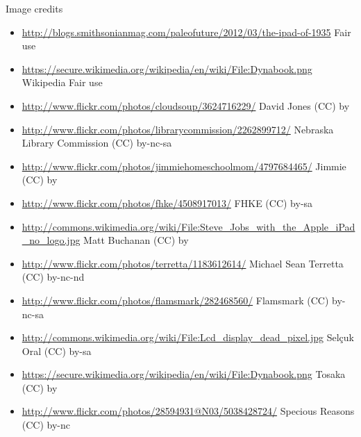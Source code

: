 \begin{frame}[plain]
  Image credits
  \tiny
  \begin{itemize}
    \item \url{http://blogs.smithsonianmag.com/paleofuture/2012/03/the-ipad-of-1935} Fair use
    \item \url{https://secure.wikimedia.org/wikipedia/en/wiki/File:Dynabook.png} Wikipedia Fair use
    \item \url{http://www.flickr.com/photos/cloudsoup/3624716229/} David Jones (CC) by
    \item \url{http://www.flickr.com/photos/librarycommission/2262899712/} Nebraska Library Commission (CC) by-nc-sa
    \item \url{http://www.flickr.com/photos/jimmiehomeschoolmom/4797684465/} Jimmie (CC) by
    \item \url{http://www.flickr.com/photos/fhke/4508917013/} FHKE (CC) by-sa
    \item \url{http://commons.wikimedia.org/wiki/File:Steve_Jobs_with_the_Apple_iPad_no_logo.jpg} Matt Buchanan (CC) by
    \item \url{http://www.flickr.com/photos/terretta/1183612614/} Michael Sean Terretta (CC) by-nc-nd
    \item \url{http://www.flickr.com/photos/flamsmark/282468560/} Flamsmark (CC) by-nc-sa
    \item \url{http://commons.wikimedia.org/wiki/File:Lcd_display_dead_pixel.jpg} Selçuk Oral (CC) by-sa
    \item \url{https://secure.wikimedia.org/wikipedia/en/wiki/File:Dynabook.png} Tosaka (CC) by
    \item \url{http://www.flickr.com/photos/28594931@N03/5038428724/} Specious Reasons (CC) by-nc
  \end{itemize}
\end{frame}
